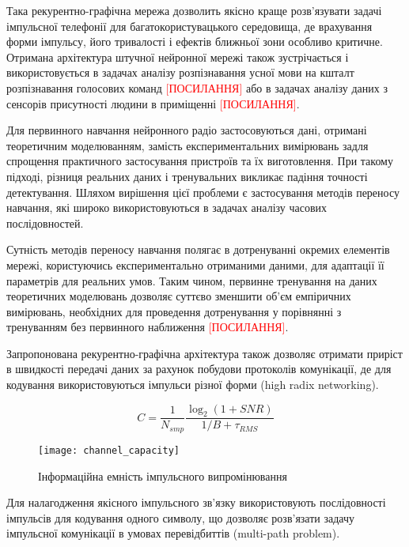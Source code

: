 Така рекурентно-графічна мережа дозволить якісно краще розв'язувати задачі 
імпульсної телефонії для багатокористувацького середовища, де врахування форми 
імпульсу, його тривалості і ефектів ближньої зони особливо критичне. Отримана 
архітектура штучної нейронної мережі також зустрічається і використовується в 
задачах аналізу розпізнавання усної мови на кшталт розпізнавання голосових 
команд \textcolor{red}{[ПОСИЛАННЯ]} або в задачах аналізу даних з сенсорів
присутності людини в приміщенні \textcolor{red}{[ПОСИЛАННЯ]}. 

Для первинного навчання нейронного радіо застосовуються дані, отримані 
теоретичним моделюванням, замість експериментальних вимірювань задля спрощення 
практичного застосування пристроїв та їх виготовлення. При такому підході,
різниця реальних даних і тренувальних викликає падіння точності детектування.
Шляхом вирішення цієї проблеми є застосування методів переносу навчання, які 
широко використовуються в задачах аналізу часових послідовностей. 

Сутність методів переносу навчання полягає в дотренуванні окремих елементів 
мережі, користуючись експериментально отриманими даними, для адаптації її 
параметрів для реальних умов. Таким чином, первинне тренування на даних
теоретичних моделювань дозволяє суттєво зменшити об'єм емпіричних вимірювань,
необхідних для проведення дотренування у порівнянні з тренуванням без 
первинного наближення \textcolor{red}{[ПОСИЛАННЯ]}.

Запропонована рекурентно-графічна архітектура також дозволяє отримати приріст 
в швидкості передачі даних за рахунок побудови протоколів комунікації, де для
кодування використовуються імпульси різної форми (high radix networking).

\begin{equation}
C = \frac{1}{N_{smp}} \frac{\log_2 \left( 1 + SNR \right)}{1/B + \tau_{RMS}} 
\end{equation}

\begin{figure}[htbp] \begin{center}
\texttt{[image: channel\_capacity]}
\caption{Інформаційна емність імпульсного випромінювання} \label{fig:info_cap}
\end{center} \end{figure}

Для налагодження якісного імпульсного зв'язку використовують послідовності 
імпульсів для кодування одного символу, що дозволяє розв'язати задачу 
імпульсної комунікації в умовах перевідбиттів (multi-path problem).

